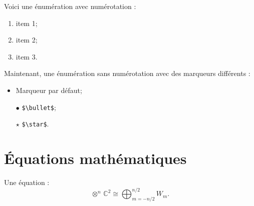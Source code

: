 \documentclass[12pt,twoside,maitrise]{dms}
\theoremstyle{definition}
\numberwithin{equation}{section}
\numberwithin{table}{chapter}
\numberwithin{figure}{chapter}
\begin{document}
Voici une énumération avec numérotation :
\begin{enumerate}
    \item item 1;
    \item item 2;
    \item item 3.
\end{enumerate}
Maintenant, une énumération sans numérotation avec des marqueurs différents :
\begin{itemize}
    \item Marqueur par défaut;
    \item[$\bullet$] \verb|$\bullet$|;
    \item[$\star$] \verb|$\star$|.
\end{itemize}

\section{Équations mathématiques}

Une équation :
\begin{equation*}
    \otimes^n\,\mathbb{C}^2 \cong \bigoplus_{m=-n/2}^{n/2} W_m.
\end{equation*}
\end{document}
